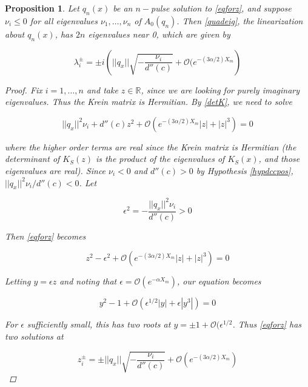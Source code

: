 \documentclass[12pt]{article}
\def\R{{\mathbb R}}
\newtheorem{proposition}{Proposition}
\begin{document}
\begin{proposition}
Let $q_n(x)$ be an $n-$pulse solution to \eqref{eqforz}, and suppose $\nu_i \leq 0$ for all eigenvalues $\nu_1, \dots, \nu_n$ of $A_0(q_n)$. Then \eqref{quadeig}, the linearization about $q_n(x)$, has $2n$ eigenvalues near 0, which are given by

\begin{equation}
\lambda_i^\pm = \pm i \left( ||q_x|| \sqrt{ -\frac{ \nu_i}{d''(c)} } + \mathcal{O}(e^{-(3 \alpha/2) X_m} \right)
\end{equation}

\begin{proof}
Fix $i = 1, \dots, n$ and take $z \in \R$, since we are looking for purely imaginary eigenvalues. Thus the Krein matrix is Hermitian. By \eqref{detK}, we need to solve

\begin{equation}\label{eqforz}
||q_x||^2 \nu_i + d''(c) z^2 + \mathcal{O}(e^{-(3 \alpha/2) X_m}|z| + |z|^3) = 0
\end{equation}

where the higher order terms are real since the Krein matrix is Hermitian (the determinant of $K_S(z)$ is the product of the eigenvalues of $K_S(x)$, and those eigenvalues are real). Since $\nu_i < 0$ and $d''(c) > 0$ by Hypothesis \ref{hypdccpos}, $||q_x||^2 \nu_i / d''(c) < 0$. Let

\begin{equation}
\epsilon^2 = -\frac{||q_x||^2 \nu_i}{d''(c)} > 0
\end{equation}

Then \eqref{eqforz} becomes

\begin{equation}
z^2 - \epsilon^2 + \mathcal{O}(e^{-(3 \alpha/2) X_m}|z| + |z|^3) = 0
\end{equation}

Letting $y = \epsilon z$ and noting that $\epsilon = \mathcal{O}(e^{-\alpha X_m})$, our equation becomes

\begin{equation}
y^2 - 1 + \mathcal{O}(\epsilon^{1/2 }|y| + \epsilon|y^3|) = 0
\end{equation}

For $\epsilon$ sufficiently small, this has two roots at $y = \pm 1 + \mathcal{O}(\epsilon^{1/2}$. Thus \eqref{eqforz} has two solutions at

\begin{equation}
z_i^\pm = \pm ||q_x|| \sqrt{ -\frac{ \nu_i}{d''(c)} } + \mathcal{O}(e^{-(3 \alpha/2) X_m})
\end{equation}


\end{proof}
\end{proposition}
\end{document}
